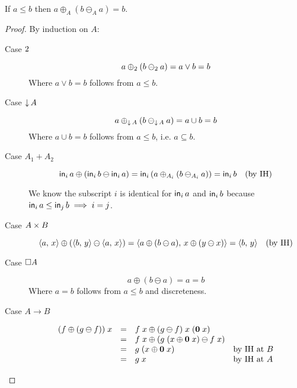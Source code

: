 \documentclass{article}
\begin{document}
\begin{lemma}
  If $a \le b$ then $a \oplus_A (b \ominus_A a) = b$.
\end{lemma}

\begin{proof}
  By induction on $A$:
  \begin{description}
    \item[Case $2$]
      \begin{equation*}
      a \oplus_2 (b \ominus_2 a) = a \vee b = b
      \end{equation*}
      Where $a \vee b = b$ follows from $a \le b$.

    \item[Case ${\downarrow}\,{A}$]
      \begin{equation*}
        a \oplus_{{\downarrow}\,{A}} (b \ominus_{{\downarrow}\,{A}} a)
        = a \cup b
        = b
      \end{equation*}
      Where $a \cup b = b$ follows from $a \le b$, i.e. $a \subseteq b$.

    \item[Case $A_1 + A_2$]
      \begin{equation*}
        \mathsf{in}_{i}\,{a} \oplus (\mathsf{in}_{i}\,{b} \ominus \mathsf{in}_{i}\,{a})
        = \mathsf{in}_{i}\,{(a \oplus_{A_i} (b \ominus_{A_i} a))}
        = \mathsf{in}_{i}\,{b}  \quad\text{(by IH)}
      \end{equation*}

      We know the subscript $i$ is identical for $\mathsf{in}_{i}\,{a}$ and $\mathsf{in}_{i}\,{b}$
      because $\mathsf{in}_{i}\,{a} \le \mathsf{in}_{j}\,{b} \implies i = j$.

    \item[Case $A \times B$]
      \begin{equation*}
        \langle{{a},\,{x}}\rangle \oplus (\langle{{b},\,{y}}\rangle \ominus \langle{{a},\,{x}}\rangle)
        = \langle{{a \oplus (b \ominus a)},\,{x \oplus (y \ominus x)}}\rangle
        = \langle{{b},\,{y}}\rangle \quad\text{(by IH)}
      \end{equation*}

    \item[Case $\square{A}$]
      \begin{equation*}
        a \oplus (b \ominus a) = a = b
      \end{equation*}
      Where $a = b$ follows from $a \le b$ and discreteness.


    \item[Case $A \to B$]
      \[\begin{array}{rcll}
      (f \oplus (g \ominus f))\; x
      &=& f\;x \oplus (g \ominus f)\; x\; (\mathbf{0}\; x)\\
      &=& f\;x \oplus (g \; (x \oplus \mathbf{0}\; x) \ominus f \; x)\\
      &=& g\; (x \oplus \mathbf{0}\; x) & \text{by IH at $B$}\\
      &=& g\; x & \text{by IH at $A$}
      \end{array}\]

  \end{description}
\end{proof}
\end{document}
